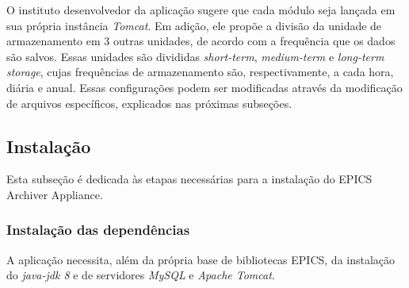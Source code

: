 \FloatBarrier

O instituto desenvolvedor da aplicação sugere que cada módulo seja lançada em
sua própria instância \textit{Tomcat}. Em adição, ele propõe a divisão da
unidade de armazenamento em 3 outras unidades, de acordo com a frequência que os
dados são salvos. Essas unidades são divididas \textit{short-term},
\textit{medium-term} e \textit{long-term storage}, cujas frequências de
armazenamento são, respectivamente, a cada hora, diária e anual. Essas
configurações podem ser modificadas através da modificação de arquivos
específicos, explicados nas próximas subseções.

\subsection {Instalação}

Esta subseção é dedicada às etapas necessárias para a instalação do EPICS
Archiver Appliance.

\subsubsection {Instalação das dependências}

A aplicação necessita, além da própria base de bibliotecas EPICS, da
instalação do \textit{java-jdk 8} e de servidores \textit{MySQL} e
\textit{Apache Tomcat}.

